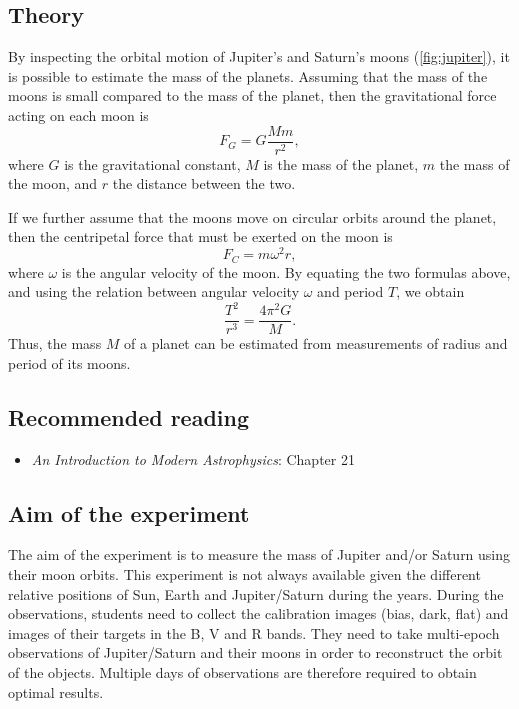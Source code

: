 \documentclass[a4paper, 11pt, fleqn]{memoir}
\begin{document}
\subsection{Theory}

By inspecting the orbital motion of Jupiter's and Saturn's moons (\cref{fig:jupiter}), it is possible to estimate the mass of the planets.
Assuming that the mass of the moons is small compared to the mass of the planet, then the gravitational force acting on each moon is
\begin{equation*}
    F_G = G \frac{M m}{r^2},
\end{equation*}
where $G$ is the gravitational constant,
$M$ is the mass of the planet,
$m$ the mass of the moon,
and $r$ the distance between the two.

If we further assume that the moons move on circular orbits around the planet, then the centripetal force that must be exerted on the moon is
\begin{equation*}
    F_C = m \omega^2 r,
\end{equation*}
where
$\omega$ is the angular velocity of the moon.
By equating the two formulas above, and using the relation between angular velocity $\omega$ and period $T$, we obtain
\begin{equation}
    \frac{T^2}{r^3} = \frac{4 \pi^2 G}{M}.
\end{equation}
Thus, the mass $M$ of a planet can be estimated from measurements of radius and period of its moons.

\subsection{Recommended reading}
\begin{itemize}
    \item \emph{An Introduction to Modern Astrophysics}\autocite{carroll2017introduction}: Chapter 21
\end{itemize}


\subsection{Aim of the experiment}

The aim of the experiment is to measure the mass of Jupiter and/or Saturn using their moon orbits.
This experiment is not always available given the different relative positions of Sun, Earth and Jupiter/Saturn during the years.
During the observations, students need to collect the calibration images (bias, dark, flat) and images of their targets in the B, V and R bands.
They need to take multi-epoch observations of Jupiter/Saturn and their moons in order to reconstruct the orbit of the objects.
Multiple days of observations are therefore required to obtain optimal results.
\end{document}
